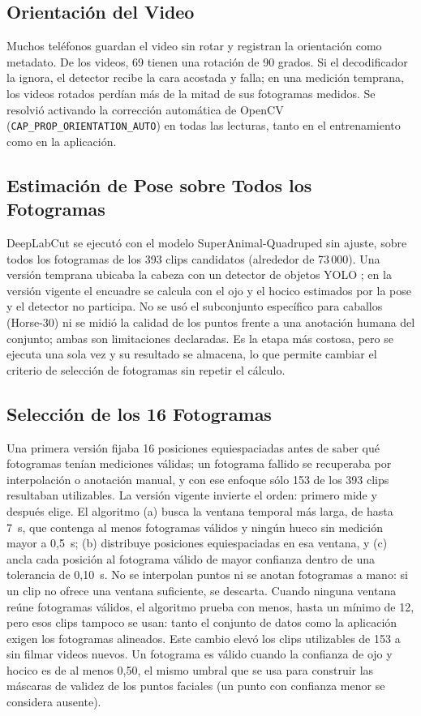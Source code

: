 \subsection{Orientación del Video}
Muchos teléfonos guardan el video sin rotar y registran la orientación como metadato. De los \VideosTotal{} videos, 69 tienen una rotación de 90 grados. Si el decodificador la ignora, el detector recibe la cara acostada y falla; en una medición temprana, los videos rotados perdían más de la mitad de sus fotogramas medidos. Se resolvió activando la corrección automática de OpenCV (\texttt{CAP\_PROP\_ORIENTATION\_AUTO}) en todas las lecturas, tanto en el entrenamiento como en la aplicación.

\subsection{Estimación de Pose sobre Todos los Fotogramas}
DeepLabCut se ejecutó con el modelo SuperAnimal-Quadruped sin ajuste, sobre todos los fotogramas de los 393 clips candidatos (alrededor de 73\,000). Una versión temprana ubicaba la cabeza con un detector de objetos YOLO \parencite{redmon2016,jocher2024}; en la versión vigente el encuadre se calcula con el ojo y el hocico estimados por la pose y el detector no participa. No se usó el subconjunto específico para caballos (Horse-30) ni se midió la calidad de los puntos frente a una anotación humana del conjunto; ambas son limitaciones declaradas. Es la etapa más costosa, pero se ejecuta una sola vez y su resultado se almacena, lo que permite cambiar el criterio de selección de fotogramas sin repetir el cálculo.

\subsection{Selección de los 16 Fotogramas}
Una primera versión fijaba 16 posiciones equiespaciadas antes de saber qué fotogramas tenían mediciones válidas; un fotograma fallido se recuperaba por interpolación o anotación manual, y con ese enfoque sólo 153 de los 393 clips resultaban utilizables. La versión vigente invierte el orden: primero mide y después elige. El algoritmo (a) busca la ventana temporal más larga, de hasta 7~s, que contenga al menos \Fotogramas{} fotogramas válidos y ningún hueco sin medición mayor a 0,5~s; (b) distribuye \Fotogramas{} posiciones equiespaciadas en esa ventana, y (c) ancla cada posición al fotograma válido de mayor confianza dentro de una tolerancia de 0,10~s. No se interpolan puntos ni se anotan fotogramas a mano: si un clip no ofrece una ventana suficiente, se descarta. Cuando ninguna ventana reúne \Fotogramas{} fotogramas válidos, el algoritmo prueba con menos, hasta un mínimo de 12, pero esos clips tampoco se usan: tanto el conjunto de datos como la aplicación exigen los \Fotogramas{} fotogramas alineados. Este cambio elevó los clips utilizables de 153 a \ClipsTotal{} sin filmar videos nuevos. Un fotograma es válido cuando la confianza de ojo y hocico es de al menos 0,50, el mismo umbral que se usa para construir las máscaras de validez de los puntos faciales (un punto con confianza menor se considera ausente).

